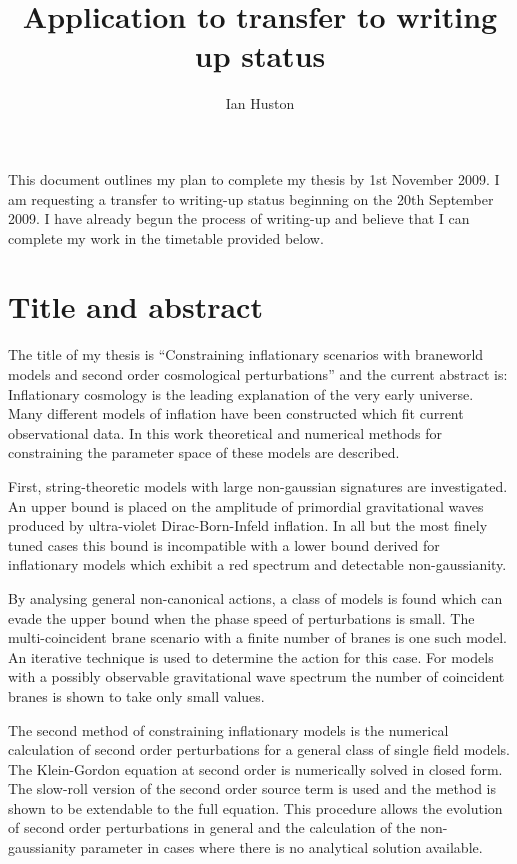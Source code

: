 \documentclass[a4paper,11pt]{article}
\title{Application to transfer to writing up status}
\author{Ian Huston}
\begin{document}
\maketitle

This document outlines my plan to complete my thesis by 1st November 2009. I am requesting a
transfer to writing-up status beginning on the 20th September 2009. I have already begun the
process of writing-up and believe that I can complete my work in the timetable provided below. 

\section*{Title and abstract}
The title of my thesis is ``Constraining inflationary scenarios with braneworld models and second
order cosmological perturbations'' and the current
abstract is:
\\

Inflationary cosmology is the leading explanation of the very early universe. 
Many different models of inflation have been constructed which fit current observational data.
In this work theoretical and numerical methods for constraining the parameter space of these models
are described.

First, string-theoretic models with large non-gaussian signatures are investigated.
An upper bound is placed on the amplitude of primordial gravitational waves produced by ultra-violet
Dirac-Born-Infeld inflation. In all but the most finely tuned cases this bound is incompatible with
a lower bound derived for inflationary models which exhibit a red spectrum and detectable
non-gaussianity. 


By analysing general non-canonical actions, a class of models is found which can
evade the upper bound when the phase speed of perturbations is small. The multi-coincident brane
scenario with a finite number of branes is one such model. An iterative technique is used to
determine the action for this case.
For models with a possibly observable gravitational wave spectrum the number of coincident branes is
shown to take only small values. 

The second method of constraining inflationary models is the numerical calculation
of second order perturbations for a general class of single field models.
The Klein-Gordon equation at second order is numerically solved in closed form. 
The slow-roll version of the second order source term is used and the method is
shown to be extendable to the full equation.
This procedure allows the evolution of second order
perturbations in general and the calculation of the non-gaussianity parameter in cases
where there is no analytical solution available.  
\end{document}
